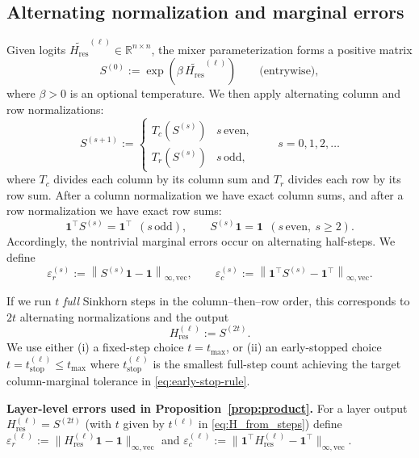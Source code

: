 \documentclass[10pt]{article}
\numberwithin{equation}{section}
\theoremstyle{plain}
\theoremstyle{definition}
\theoremstyle{remark}
\newcommand{\R}{\mathbb{R}}
\newcommand{\ones}{\mathbf{1}}
\newcommand{\norm}[1]{\left\lVert #1 \right\rVert}
\newcommand{\Hres}{H_{\mathrm{res}}}
\newcommand{\tstop}{t_{\mathrm{stop}}}
\newcommand{\tmax}{t_{\max}}
\begin{document}
\subsection{Alternating normalization and marginal errors}\label{subsec:sinkhorn-iter}
Given logits \(\widetilde{\Hres}^{(\ell)}\in\R^{n\times n}\), the mixer parameterization forms a positive matrix
\begin{equation}
S^{(0)}:=\exp(\beta\,\widetilde{\Hres}^{(\ell)}) \qquad \text{(entrywise)},
\end{equation}
where $\beta>0$ is an optional temperature. We then apply alternating column and row normalizations:
\begin{equation}
S^{(s+1)} :=
\begin{cases}
T_c(S^{(s)}) & s \,\text{even},\\
T_r(S^{(s)}) & s \,\text{odd},
\end{cases}
\qquad s=0,1,2,\dots
\end{equation}
where $T_c$ divides each column by its column sum and $T_r$ divides each row by its row sum. After a column
normalization we have exact column sums, and after a row normalization we have exact row sums:
\begin{equation}
\ones^\top S^{(s)}=\ones^\top \ \ (s \,\text{odd}),\qquad
S^{(s)}\ones=\ones \ \ (s \,\text{even},\ s\ge 2).
\end{equation}
Accordingly, the nontrivial marginal errors occur on alternating half-steps. We define
\begin{equation}
\varepsilon_r^{(s)}:=\norm{S^{(s)}\ones-\ones}_{\infty,\mathrm{vec}},\qquad
\varepsilon_c^{(s)}:=\norm{\ones^\top S^{(s)}-\ones^\top}_{\infty,\mathrm{vec}}.
\end{equation}

If we run $t$ \emph{full} Sinkhorn steps in the column--then--row order, this corresponds to $2t$ alternating normalizations and the output
\begin{equation}
\Hres^{(\ell)}:=S^{(2t)}.
\end{equation}
We use either (i) a fixed-step choice $t=\tmax$, or (ii) an early-stopped choice $t=\tstop^{(\ell)}\le \tmax$ where $\tstop^{(\ell)}$
is the smallest full-step count achieving the target column-marginal tolerance in \eqref{eq:early-stop-rule}.

\noindent\textbf{Layer-level errors used in Proposition~\ref{prop:product}.}
For a layer output $\Hres^{(\ell)}=S^{(2t)}$ (with $t$ given by $t^{(\ell)}$ in \eqref{eq:H_from_steps}) define
$\varepsilon_r^{(\ell)}:=\|\Hres^{(\ell)}\ones-\ones\|_{\infty,\mathrm{vec}}$ and
$\varepsilon_c^{(\ell)}:=\|\ones^\top \Hres^{(\ell)}-\ones^\top\|_{\infty,\mathrm{vec}}$.
\end{document}
